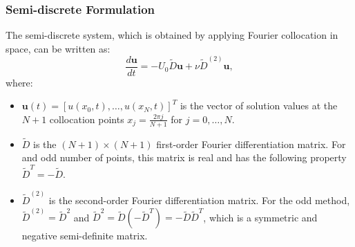 \subsubsection{Semi-discrete Formulation}
The semi-discrete system, which is obtained by applying Fourier collocation in space, can be written as:
\begin{equation}
	\frac{d\mathbf{u}}{dt} = -U_0 \tilde{D} \mathbf{u} + \nu \tilde{D}^{(2)} \mathbf{u},
	\label{eq:semidiscrete_const_U0}
\end{equation}
where:
\begin{itemize}
	\item $\mathbf{u}(t) = [u(x_0,t), \ldots, u(x_N,t)]^T$ is the vector of solution values at the $N+1$ collocation points $x_j = \frac{2\pi j}{N+1}$ for $j=0, \dots, N$.
	\item $\tilde{D}$ is the $(N+1) \times (N+1)$ first-order Fourier differentiation matrix. For and odd number of points, this matrix is real and has the following property $\tilde{D}^T = -\tilde{D}$.
	\item $\tilde{D}^{(2)}$ is the second-order Fourier differentiation matrix. For the odd method, $\tilde{D}^{(2)} = \tilde{D}^2$ and $\tilde{D}^2 = \tilde{D}(-\tilde{D}^T) = -\tilde{D}\tilde{D}^T$, which is a symmetric and negative semi-definite matrix.
\end{itemize}

